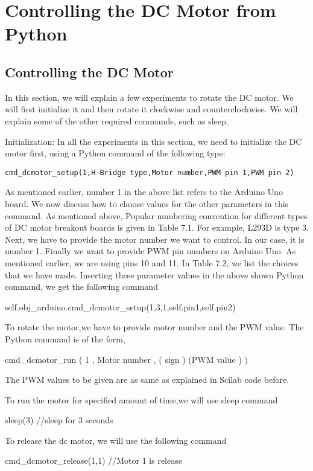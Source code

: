 \section{Controlling the DC Motor from Python}
\subsection{Controlling the DC Motor}
In this section, we will explain a few experiments to rotate the DC
motor. We will first initialize it and then rotate it clockwise and
counterclockwise. We will explain some of the other required commands,
such as sleep.

Initialization: In all the experiments in this section, we need to
initialize the DC motor first, using a Python command of the following
type:
\begin{lstlisting}[style=nonumbers]
  cmd_dcmotor_setup(1,H-Bridge type,Motor number,PWM pin 1,PWM pin 2)
\end{lstlisting}

As mentioned earlier, number 1 in the above list refers to the Arduino Uno board.
We now discuss how to choose values for the other parameters in this command. As
mentioned above, Popular numbering convention for different types of DC motor breakout
boards is given in Table 7.1. For example, L293D is type 3. Next, we have to provide
the motor number we want to control. In our case, it is number 1. Finally we want
to provide PWM pin numbers on Arduino Uno. As mentioned earlier, we are using
pins 10 and 11. In Table 7.2, we list the choices that we have made. Inserting these
parameter values in the above shown Python command, we get the following command

self.obj\_arduino.cmd\_dcmotor\_setup(1,3,1,self.pin1,self.pin2)

To rotate the motor,we have to provide motor number
and the PWM value. The Python command is of the form,

cmd\_dcmotor\_run ( 1 , Motor number , ( sign ) (PWM value ) )

The PWM values to be given are as same as explained in Scilab code before.

To run the motor for specified amount of time,we will use sleep command

sleep(3) //sleep for 3 seconds

To release the dc motor, we will use the following command

cmd\_dcmotor\_release(1,1) //Motor 1 is release


